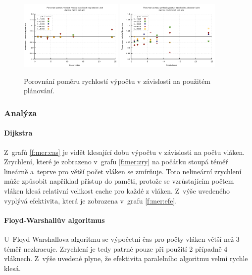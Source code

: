 \begin{figure}
    \centering
    \includegraphics[width=0.45\textwidth]{../grafy/02_openMP/02-05-Dijkstra_schedule_v1}
    \includegraphics[width=0.45\textwidth]{../grafy/02_openMP/02-05-Floyd_schedule_v1}
    \caption{Porovnání poměru rychlostí výpočtu v závislosti na použitém plánování.}
    \label{f:mer:pomerplanovani}
\end{figure}

\subsubsection{Analýza}
\paragraph{Dijkstra}
Z~grafů \ref{f:mer:cas} je vidět klesající dobu výpočtu v závislosti na počtu vláken.
Zrychlení, které je zobrazeno v~grafu \ref{f:mer:zry} na počátku stoupá téměř lineárně a~teprve pro větší počet vláken 
se zmírňuje. Toto nelineární zrychlení může způsobit například přístup do paměti, protože se vzrůstajícím počtem vláken klesá 
relativní velikost cache pro každé z vláken.
Z~výše uvedeného vyplývá efektivita, která je zobrazena v~grafu \ref{f:mer:efe}.

\paragraph{Floyd-Warshallův algoritmus}
U~Floyd-Warshallova algoritmu se výpočetní čas pro počty vláken větší než 3 téměř nezkracuje. 
Zrychlení je tedy patrné pouze při použití 2 případně 4 vláknech. Z~výše uvedené plyne, že efektivita paralelního algoritmu velmi rychle klesá.

